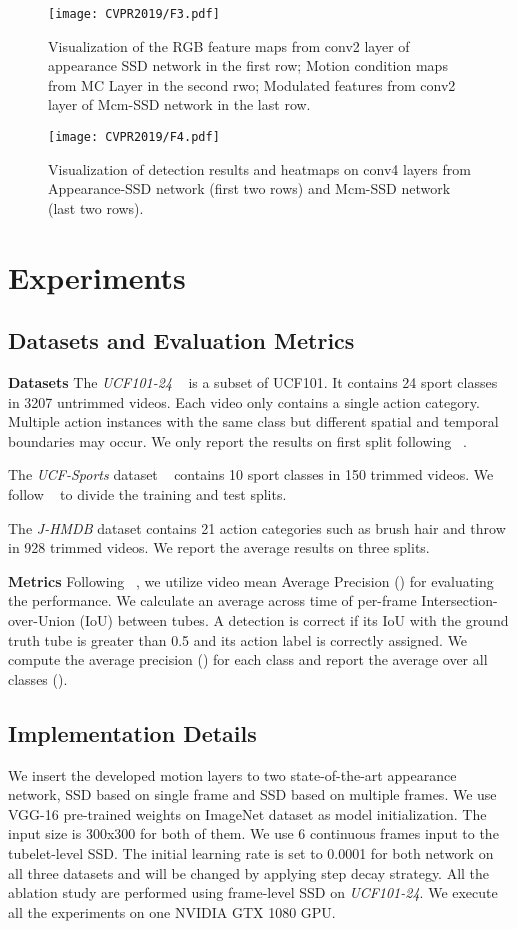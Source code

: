 \documentclass[10pt,twocolumn,letterpaper]{article}
\begin{document}
\begin{figure*}[ht]
\centering
\texttt{[image: CVPR2019/F3.pdf]}
\caption{Visualization of the RGB feature maps from conv2 layer of appearance SSD network in the first row; Motion condition maps from MC Layer in the second rwo; Modulated features from conv2 layer of Mcm-SSD network in the last row. }
\label{Fig:maps}
\end{figure*}
\begin{figure*}[ht]
\centering
\texttt{[image: CVPR2019/F4.pdf]}
\caption{Visualization of detection results and heatmaps on conv4 layers from Appearance-SSD network (first two rows) and Mcm-SSD network (last two rows). }
\label{Fig:heatmap}
\end{figure*}

\section{Experiments}
 
\subsection{Datasets and Evaluation Metrics}
{\bf{Datasets}} The {\it{UCF101-24}} ~\cite{Soomro2012} is a subset of UCF101. It contains 24 sport classes in 3207 untrimmed videos. Each video only contains a single action category. Multiple action instances with the same class but different spatial and temporal boundaries may occur. We only report the results on first split following ~\cite{}. 

The {\it{UCF-Sports}} dataset ~\cite{Rodrigue2008} contains 10 sport classes in 150 trimmed videos. We follow ~\cite{} to divide the training and test splits. 

The {\it{J-HMDB}} dataset contains 21 action categories such as brush hair and throw in 928 trimmed videos. We report the average results on three splits.

{\bf{Metrics}} Following ~\cite{}, we utilize video mean Average Precision () for evaluating the performance. We calculate an average across time of per-frame Intersection-over-Union (IoU) between tubes. A detection is correct if its IoU with the ground truth tube is greater than 0.5 and its action label is correctly assigned. We compute the average precision () for each class and report the average over all classes ().  

\subsection{Implementation Details}
We insert the developed motion layers to two state-of-the-art appearance network, SSD based on single frame and SSD based on multiple frames. We use VGG-16 pre-trained weights on ImageNet dataset as model initialization. The input size is 300x300 for both of them. We use 6 continuous frames input to the tubelet-level SSD. The initial learning rate is set to 0.0001 for both network on all three datasets and will be changed by applying step decay strategy. All the ablation study are performed using frame-level SSD on {\it{UCF101-24}}. We execute all the experiments on  one NVIDIA GTX 1080 GPU.
\end{document}
